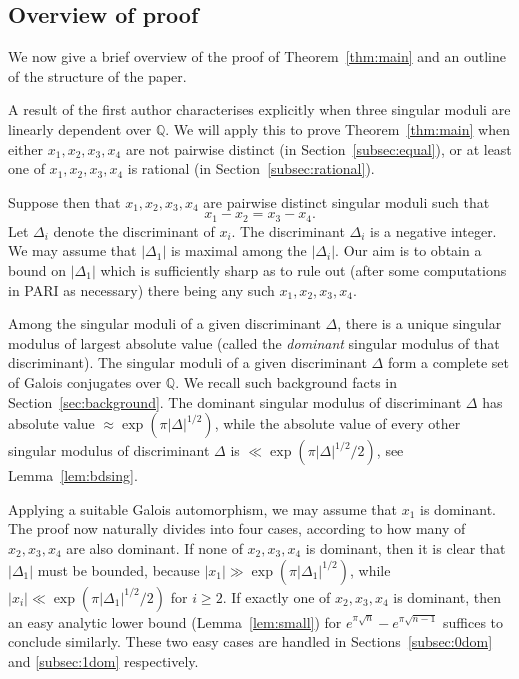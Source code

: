 \documentclass[12pt,a4paper,oneside]{amsart}
\begin{document}
	
	

	
	

    \subsection{Overview of proof}

    We now give a brief overview of the proof of Theorem~\ref{thm:main} and an outline of the structure of the paper.

    A result of the first author \cite[Theorem~1.6]{Fowler24} characterises explicitly when three singular moduli are linearly dependent over $\mathbb{Q}$.
    We will apply this to prove Theorem~\ref{thm:main} when either $x_1, x_2, x_3, x_4$ are not pairwise distinct (in Section~\ref{subsec:equal}), or at least one of $x_1, x_2, x_3, x_4$ is rational (in Section~\ref{subsec:rational}).

    Suppose then that $x_1, x_2, x_3, x_4$ are pairwise distinct singular moduli such that
\[ x_1 - x_2 = x_3 - x_4.\]
Let $\Delta_i$ denote the discriminant of $x_i$.
The discriminant $\Delta_i$ is a negative integer.
We may assume that $\lvert \Delta_1 \rvert$ is maximal among the $\lvert \Delta_i \rvert$.
Our aim is to obtain a bound on $\lvert \Delta_1 \rvert$ which is sufficiently sharp as to rule out (after some computations in PARI as necessary) there being any such $x_1, x_2, x_3, x_4$.
    
    
    Among the singular moduli of a given discriminant $\Delta$, there is a unique singular modulus of largest absolute value (called the \textit{dominant} singular modulus of that discriminant).
    The singular moduli of a given discriminant $\Delta$ form a complete set of Galois conjugates over $\mathbb{Q}$.
    We recall such background facts in Section~\ref{sec:background}.
    The dominant singular modulus of discriminant $\Delta$ has absolute value $\approx \exp(\pi \lvert \Delta \rvert^{1/2})$, while the absolute value of every other singular modulus of discriminant $\Delta$ is $\ll \exp(\pi \lvert \Delta \rvert^{1/2} / 2)$, see Lemma~\ref{lem:bdsing}.
    
    Applying a suitable Galois automorphism, we may assume that $x_1$ is dominant.
    The proof now naturally divides into four cases, according to how many of $x_2, x_3, x_4$ are also dominant.
    If none of $x_2, x_3, x_4$ is dominant, then it is clear that $\lvert \Delta_1 \rvert$ must be bounded, because $\lvert x_1 \rvert \gg \exp(\pi \lvert \Delta_1 \rvert^{1/2})$, while $\lvert x_i \rvert \ll \exp(\pi \lvert \Delta_1 \rvert^{1/2}/2)$ for $i \geq 2$.
    If exactly one of $x_2, x_3, x_4$ is dominant, then an easy analytic lower bound (Lemma~\ref{lem:small}) for $e^{\pi \sqrt{n}} - e^{\pi \sqrt{n-1}}$ suffices to conclude similarly.
    These two easy cases are handled in Sections~\ref{subsec:0dom} and \ref{subsec:1dom} respectively.
\end{document}
